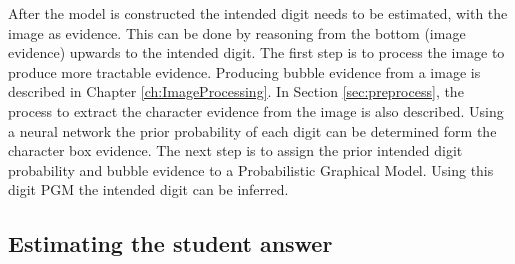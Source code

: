

After the model is constructed the intended digit needs to be estimated, with the image as evidence. This can be done by reasoning from the bottom (image evidence) upwards to the intended digit. The first step is to process the image to produce more tractable evidence. Producing bubble evidence from a image is described in Chapter \ref{ch:ImageProcessing}. In Section \ref{sec:preprocess}, the process to extract the character evidence from the image is also described. Using a neural network the prior probability of each digit can be determined form the character box evidence. The next step is to assign the prior intended digit probability and bubble evidence to a Probabilistic Graphical Model. Using this digit PGM the intended digit can be inferred.

\subsection{Estimating the student answer}
\label{sec:studentAnswer}

